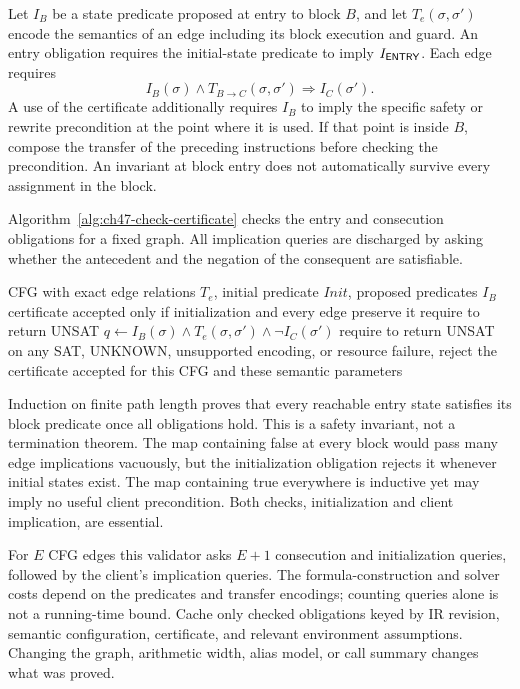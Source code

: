 Let $I_B$ be a state predicate proposed at entry to block $B$, and let $T_e(\sigma,\sigma')$ encode the semantics of an edge including its block execution and guard.
An entry obligation requires the initial-state predicate to imply $I_{\textsf{ENTRY}}$.
Each edge requires
\[
  I_B(\sigma)\land T_{B\to C}(\sigma,\sigma')
       \Longrightarrow I_C(\sigma').
\]
A use of the certificate additionally requires $I_B$ to imply the specific safety or rewrite precondition at the point where it is used.
If that point is inside $B$, compose the transfer of the preceding instructions before checking the precondition.
An invariant at block entry does not automatically survive every assignment in the block.

Algorithm~\ref{alg:ch47-check-certificate} checks the entry and consecution obligations for a fixed graph.
All implication queries are discharged by asking whether the antecedent and the negation of the consequent are satisfiable.

\begin{algorithm}[htbp]
\caption{Check a proposed invariant map before trusting its clients.}
\label{alg:ch47-check-certificate}
\begin{pseudocode}
\Require CFG with exact edge relations $T_e$, initial predicate $Init$, proposed predicates $I_B$
\Ensure certificate accepted only if initialization and every edge preserve it
\State require  to return UNSAT
  \State $q\gets I_B(\sigma)\land T_e(\sigma,\sigma')\land\neg I_C(\sigma')$
  \State require  to return UNSAT
\EndFor
\State on any SAT, UNKNOWN, unsupported encoding, or resource failure, reject the certificate
\State \Return accepted for this CFG and these semantic parameters
\end{pseudocode}
\end{algorithm}

Induction on finite path length proves that every reachable entry state satisfies its block predicate once all obligations hold.
This is a safety invariant, not a termination theorem.
The map containing false at every block would pass many edge implications vacuously, but the initialization obligation rejects it whenever initial states exist.
The map containing true everywhere is inductive yet may imply no useful client precondition.
Both checks, initialization and client implication, are essential.

For $E$ CFG edges this validator asks $E+1$ consecution and initialization queries, followed by the client's implication queries.
The formula-construction and solver costs depend on the predicates and transfer encodings; counting queries alone is not a running-time bound.
Cache only checked obligations keyed by IR revision, semantic configuration, certificate, and relevant environment assumptions.
Changing the graph, arithmetic width, alias model, or call summary changes what was proved.

